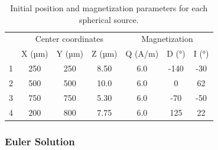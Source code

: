 \documentclass[manuscript,revised]{geophysics}
\begin{document}
\begin{table}[htbp]
\caption{Initial position and magnetization parameters for each spherical source.}
\label{tab:directmodel}
\centering
\begin{tabular}[width=1.0\textwidth]{ccccccc}
\rowcolor[HTML]{E7E7E7} 
\cellcolor[HTML]{E7E7E7}                         & \multicolumn{3}{c}{\cellcolor[HTML]{E7E7E7}Center coordinates} & \multicolumn{3}{c}{\cellcolor[HTML]{E7E7E7}Magnetization} \\
\rowcolor[HTML]{E7E7E7} 
\multirow{-2}{*}{\cellcolor[HTML]{E7E7E7}Sphere} & X (µm)              & Y (µm)             & Z (µm)             & Q (A/m)            & D (°)            & I (°)            \\
1                                                & 250                 & 250                & 8.50               & 6.0                & -140             & -30              \\
\rowcolor[HTML]{E7E7E7} 
2                                                & 500                 & 500                & 10.0               & 6.0                & 0                & 62               \\
3                                                & 750                 & 750                & 5.30               & 6.0                & -70              & -50              \\
\rowcolor[HTML]{E7E7E7} 
4                                                & 200                 & 800                & 7.75               & 6.0                & 125              & 22              
\end{tabular}
\end{table}



\subsubsection{Euler Solution}

\end{document}
